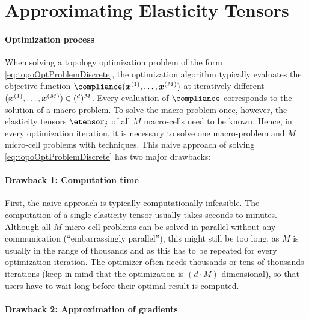 \section{Approximating Elasticity Tensors}
\label{sec:62tensors}

\paragraph{Optimization process}

When solving a topology optimization problem of the form
\eqref{eq:topoOptProblemDiscrete}, the optimization algorithm typically
evaluates the objective function $\compliance(\*x^{(1)}, \dotsc, \*x^{(M)})$
at iteratively different 
$(\*x^{(1)}, \dotsc, \*x^{(M)}) \in (\real^d)^M$.
Every evaluation of $\compliance$ corresponds to the solution of a
macro-problem.
To solve the macro-problem once, however, the elasticity tensors
$\etensor_j$ of all $M$ macro-cells need to be known.
Hence, in every optimization iteration, it is necessary to solve
one macro-problem and $M$ micro-cell problems with \fem techniques.
This naive approach of solving \eqref{eq:topoOptProblemDiscrete}
has two major drawbacks:

\paragraph{Drawback 1: Computation time}

First, the naive approach is typically computationally infeasible.
The computation of a single elasticity tensor usually takes seconds to
minutes.
Although all $M$ micro-cell problems can be solved in parallel without any
communication (``embarrassingly parallel''), this might still be too long,
as $M$ is usually in the range of thousands and
as this has to be repeated for every optimization iteration.
The optimizer often needs thousands or tens of thousands iterations
(keep in mind that the optimization is $(d \cdot M)$-dimensional),
so that users have to wait long before their optimal result is computed.

\paragraph{Drawback 2: Approximation of gradients}

